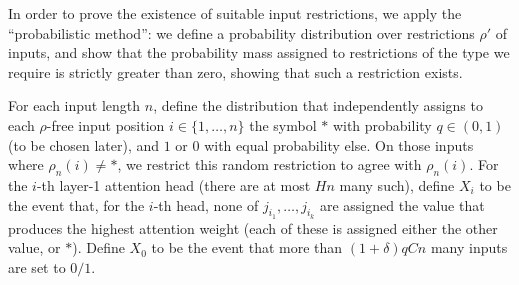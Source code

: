 \documentclass[11pt,a4paper]{article}
\begin{document}

In order to prove the existence of suitable input restrictions, we apply the ``probabilistic method'': we define a probability distribution over restrictions $\rho'$ of inputs, and show that the probability mass assigned to restrictions of the type we require is strictly greater than zero, showing that such a restriction exists.

For each input length $n$, define the distribution that independently assigns to each $\rho$-free input position $i \in \{1, \dots, n\}$ the symbol $*$ with probability $q \in (0,1)$ (to be chosen later), and $1$ or $0$ with equal probability else.
On those inputs where $\rho_n(i) \neq *$, we restrict this random restriction to agree with $\rho_n(i)$.
For the $i$-th layer-1 attention head (there are at most $Hn$ many such), define $X_i$ to be the event that, for the $i$-th head, none of $j_{i_1}, \dots, j_{i_k}$ are assigned the value that produces the highest attention weight (each of these is assigned either the other value, or $*$).
Define $X_0$ to be the event that more than $(1+\delta)qCn$ many inputs are set to $0/1$.
\end{document}

